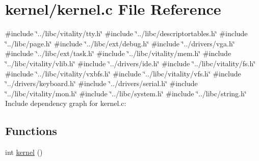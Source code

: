 \hypertarget{a00062}{}\section{kernel/kernel.c File Reference}
\label{a00062}
{\ttfamily \#include \char`\"{}../libc/vitality/tty.\+h\char`\"{}}\newline
{\ttfamily \#include \char`\"{}../libc/descriptortables.\+h\char`\"{}}\newline
{\ttfamily \#include \char`\"{}../libc/page.\+h\char`\"{}}\newline
{\ttfamily \#include \char`\"{}../libc/ext/debug.\+h\char`\"{}}\newline
{\ttfamily \#include \char`\"{}../drivers/vga.\+h\char`\"{}}\newline
{\ttfamily \#include \char`\"{}../libc/ext/task.\+h\char`\"{}}\newline
{\ttfamily \#include \char`\"{}../libc/vitality/mem.\+h\char`\"{}}\newline
{\ttfamily \#include \char`\"{}../libc/vitality/vlib.\+h\char`\"{}}\newline
{\ttfamily \#include \char`\"{}../drivers/ide.\+h\char`\"{}}\newline
{\ttfamily \#include \char`\"{}../libc/vitality/fs.\+h\char`\"{}}\newline
{\ttfamily \#include \char`\"{}../libc/vitality/vxbfs.\+h\char`\"{}}\newline
{\ttfamily \#include \char`\"{}../libc/vitality/vfs.\+h\char`\"{}}\newline
{\ttfamily \#include \char`\"{}../drivers/keyboard.\+h\char`\"{}}\newline
{\ttfamily \#include \char`\"{}../drivers/serial.\+h\char`\"{}}\newline
{\ttfamily \#include \char`\"{}../libc/vitality/mon.\+h\char`\"{}}\newline
{\ttfamily \#include \char`\"{}../libc/system.\+h\char`\"{}}\newline
{\ttfamily \#include \char`\"{}../libc/string.\+h\char`\"{}}\newline
Include dependency graph for kernel.\+c\+:
\subsection*{Functions}
\begin{DoxyCompactItemize}
\item 
int \hyperlink{a00062_a4ee3d1f05046b7afc6b4d516bf10667a_a4ee3d1f05046b7afc6b4d516bf10667a}{kernel} ()
\end{DoxyCompactItemize}
